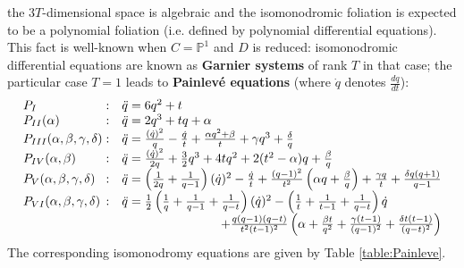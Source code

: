 \documentclass[12]{amsart}
\begin{document}
the $3T$-dimensional space is algebraic and the isomonodromic foliation is expected to be 
a polynomial foliation (i.e. defined by polynomial differential equations). This fact is well-known 
when $C=\mathbb P^1$ and $D$ is reduced: isomonodromic differential equations are known as {\bf Garnier systems}
of rank $T$ in that case; the particular case $T=1$ leads to {\bf Painlev\'e equations} (where $\dot{q}$ denotes $\frac{dq}{dt}$):
\begin{equation}\label{eq:PainleveEquations}
\begin{matrix}
P_I\hfill :& \ddot{q}=6q^2+t\hfill\hfill\\
P_{II}(\alpha)\hfill :& \ddot{q}=2q^3+tq+\alpha\hfill\hfill\\
P_{III}(\alpha,\beta,\gamma,\delta)\hfill :& \ddot{q}=\frac{(\dot{q})^2}{q}-\frac{\dot{q}}{t}+\frac{\alpha q^2+\beta}{t}+\gamma q^3+\frac{\delta}{q}\hfill\hfill\\
P_{IV}(\alpha,\beta)\hfill :& \ddot{q}=\frac{(\dot{q})^2}{2q}+\frac{3}{2}q^3+4tq^2+2(t^2-\alpha)q+\frac{\beta}{q}\hfill\hfill\\
P_{V}(\alpha,\beta,\gamma,\delta)\hfill :& \ddot{q}=\left(\frac{1}{2q}+\frac{1}{q-1}\right)(\dot{q})^2-\frac{\dot{q}}{t}+\frac{(q-1)^2}{t^2}\left(\alpha q+\frac{\beta}{q}\right)
+\frac{\gamma q}{t}+\frac{\delta q(q+1)}{q-1}\\
P_{VI}(\alpha,\beta,\gamma,\delta)\hfill :& \ddot{q}=\frac{1}{2}\left(\frac{1}{q}+\frac{1}{q-1}+\frac{1}{q-t}\right)(\dot{q})^2-\left(\frac{1}{t}+\frac{1}{t-1}+\frac{1}{q-t}\right)\dot{q}\hfill\hfill\\
&\hfill+\frac{q(q-1)(q-t)}{t^2(t-1)^2}\left(\alpha+ \frac{\beta t}{q^2}+ \frac{\gamma (t-1)}{(q-1)^2}+ \frac{\delta t(t-1)}{(q-t)^2}\right)
\end{matrix}
\end{equation}
The corresponding isomonodromy equations are given by Table \ref{table:Painleve}.
\end{document}
